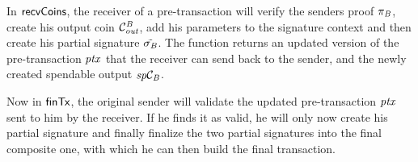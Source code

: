 In $\mathsf{recvCoins}$, the receiver of a pre-transaction will verify the senders proof $\pi_{\mathit{B}}$, create his output coin $\mathcal{C}_{\mathit{out}}^{\mathit{B}}$, add his parameters to the signature context and then create his partial signature $\tilde{\sigma_{\mathit{B}}}$.
The function returns an updated version of the pre-transaction $\mathit{ptx}$ that the receiver can send back to the sender, and the newly created spendable output $\mathit{sp}\mathcal{C}_{\mathit{B}}$.

Now in $\mathsf{finTx}$, the original sender will validate the updated pre-transaction $\mathit{ptx}$ sent to him by the receiver.
If he finds it as valid, he will only now create his partial signature and finally finalize the two partial signatures into the final composite one, with which he can then build the final transaction.

\begin{figure}
    \begin{center}
\end{center}
\end{figure}

